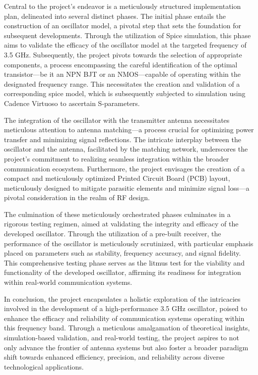 Central to the project's endeavor is a meticulously structured implementation plan, delineated into several distinct phases. The initial phase entails the construction of an oscillator model, a pivotal step that sets the foundation for subsequent developments. Through the utilization of Spice simulation, this phase aims to validate the efficacy of the oscillator model at the targeted frequency of 3.5 GHz. Subsequently, the project pivots towards the selection of appropriate components, a process encompassing the careful identification of the optimal transistor—be it an NPN BJT or an NMOS—capable of operating within the designated frequency range. This necessitates the creation and validation of a corresponding spice model, which is subsequently subjected to simulation using Cadence Virtuoso to ascertain S-parameters.\par

The integration of the oscillator with the transmitter antenna necessitates meticulous attention to antenna matching—a process crucial for optimizing power transfer and minimizing signal reflections. The intricate interplay between the oscillator and the antenna, facilitated by the matching network, underscores the project's commitment to realizing seamless integration within the broader communication ecosystem. Furthermore, the project envisages the creation of a compact and meticulously optimized Printed Circuit Board (PCB) layout, meticulously designed to mitigate parasitic elements and minimize signal loss—a pivotal consideration in the realm of RF design.\par

The culmination of these meticulously orchestrated phases culminates in a rigorous testing regimen, aimed at validating the integrity and efficacy of the developed oscillator. Through the utilization of a pre-built receiver, the performance of the oscillator is meticulously scrutinized, with particular emphasis placed on parameters such as stability, frequency accuracy, and signal fidelity. This comprehensive testing phase serves as the litmus test for the viability and functionality of the developed oscillator, affirming its readiness for integration within real-world communication systems.\par

In conclusion, the project encapsulates a holistic exploration of the intricacies involved in the development of a high-performance 3.5 GHz oscillator, poised to enhance the efficacy and reliability of communication systems operating within this frequency band. Through a meticulous amalgamation of theoretical insights, simulation-based validation, and real-world testing, the project aspires to not only advance the frontier of antenna systems but also foster a broader paradigm shift towards enhanced efficiency, precision, and reliability across diverse technological applications.